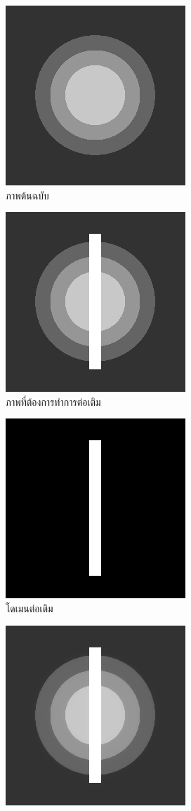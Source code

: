 \documentclass[hidelinks,a4paper,14pt]{article}
\numberwithin{equation}{section}							%
\begin{document}
{			\begin{figure}[H]
				\centering
				\begin{subfigure}{0.3\linewidth}
					\centering
					\includegraphics[width=0.3\linewidth]{images/grayscale_inpaint/original.png}
					\caption{ภาพต้นฉบับ}
				\end{subfigure}
				\begin{subfigure}{0.3\linewidth}
					\centering
					\includegraphics[width=0.3\linewidth]{images/grayscale_inpaint/toinapint.png}
					\caption{ภาพที่ต้องการทำการต่อเติม}
				\end{subfigure}
			\begin{subfigure}{0.3\linewidth}
				\centering
					\includegraphics[width=0.3\linewidth]{images/grayscale_inpaint/inpaintdomain.png}
				\caption{โดเมนต่อเติม}
			\end{subfigure}
		\begin{subfigure}{0.3\linewidth}
			\centering
			\includegraphics[width=0.3\linewidth]{images/grayscale_inpaint/result_timemarch.png}

\end{subfigure}
\end{figure}}
\end{document}
